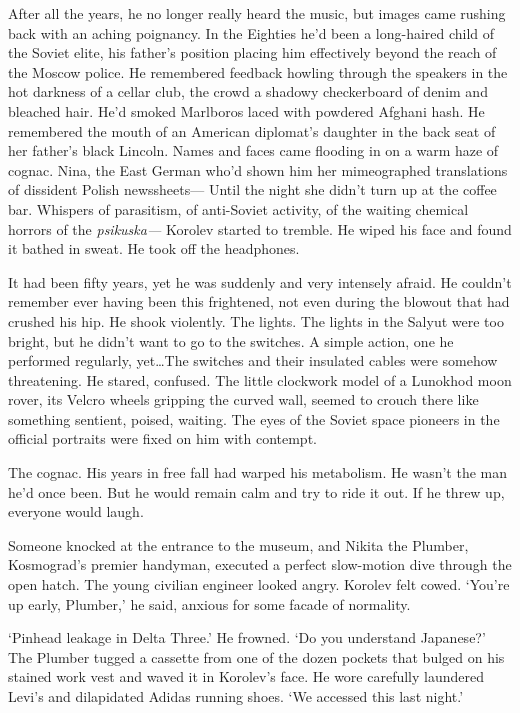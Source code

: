 After all the years, he no longer really heard the music, but images came rushing back with an aching poignancy. In the Eighties he'd been a long-haired child of the Soviet elite, his father's position placing him effectively beyond the reach of the Moscow police. He remembered feedback howling through the speakers in the hot darkness of a cellar club, the crowd a shadowy checkerboard of denim and bleached hair. He'd smoked Marlboros laced with powdered Afghani hash. He remembered the mouth of an American diplomat's daughter in the back seat of her father's black Lincoln. Names and faces came flooding in on a warm haze of cognac. Nina, the East German who'd shown him her mimeographed translations of dissident Polish newssheets--- Until the night she didn't turn up at the coffee bar. Whispers of parasitism, of anti-Soviet activity, of the waiting chemical horrors of the \textit{psikuska---} Korolev started to tremble. He wiped his face and found it bathed in sweat. He took off the headphones.

It had been fifty years, yet he was suddenly and very intensely afraid. He couldn't remember ever having been this frightened, not even during the blowout that had crushed his hip. He shook violently. The lights. The lights in the Salyut were too bright, but he didn't want to go to the switches. A simple action, one he performed regularly, yet\ldots The switches and their insulated cables were somehow threatening. He stared, confused. The little clockwork model of a Lunokhod moon rover, its Velcro wheels gripping the curved wall, seemed to crouch there like something sentient, poised, waiting. The eyes of the Soviet space pioneers in the official portraits were fixed on him with contempt.

The cognac. His years in free fall had warped his metabolism. He wasn't the man he'd once been. But he would remain calm and try to ride it out. If he threw up, everyone would laugh.

Someone knocked at the entrance to the museum, and Nikita the Plumber, Kosmograd's premier handyman, executed a perfect slow-motion dive through the open hatch. The young civilian engineer looked angry. Korolev felt cowed. `You're up early, Plumber,' he said, anxious for some facade of normality.

`Pinhead leakage in Delta Three.' He frowned. `Do you understand Japanese?' The Plumber tugged a cassette from one of the dozen pockets that bulged on his stained work vest and waved it in Korolev's face. He wore carefully laundered Levi's and dilapidated Adidas running shoes. `We accessed this last night.'

